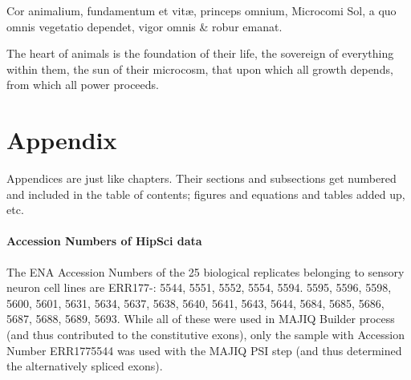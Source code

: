 \begin{savequote}[8cm]
\textlatin{Cor animalium, fundamentum e\longs t vitæ, princeps omnium, Microco\longs mi Sol, a quo omnis vegetatio dependet, vigor omnis \& robur emanat.}

The heart of animals is the foundation of their life, the sovereign of everything within them, the sun of their microcosm, that upon which all growth depends, from which all power proceeds.
\end{savequote}

\chapter{\label{app:appendix}Appendix}

\minitoc

Appendices are just like chapters.  Their sections and subsections get numbered and included in the table of contents; figures and equations and tables added up, etc.  


\subsubsection{Accession Numbers of HipSci data} \label{app:hipsci_celllines}
The ENA Accession Numbers of the 25 biological replicates belonging to sensory neuron cell lines \cite{ipscneurons} are ERR177-: 
5544, 5551, 5552, 5554, 5594. 5595, 5596, 5598, 5600, 5601, 5631, 5634, 5637, 5638, 5640, 5641, 5643, 5644, 5684, 5685, 5686, 5687, 5688, 5689, 5693.
While all of these were used in MAJIQ Builder process (and thus contributed to the constitutive exons), only the sample with Accession Number ERR1775544 was used with the MAJIQ PSI step (and thus determined the alternatively spliced exons). 

